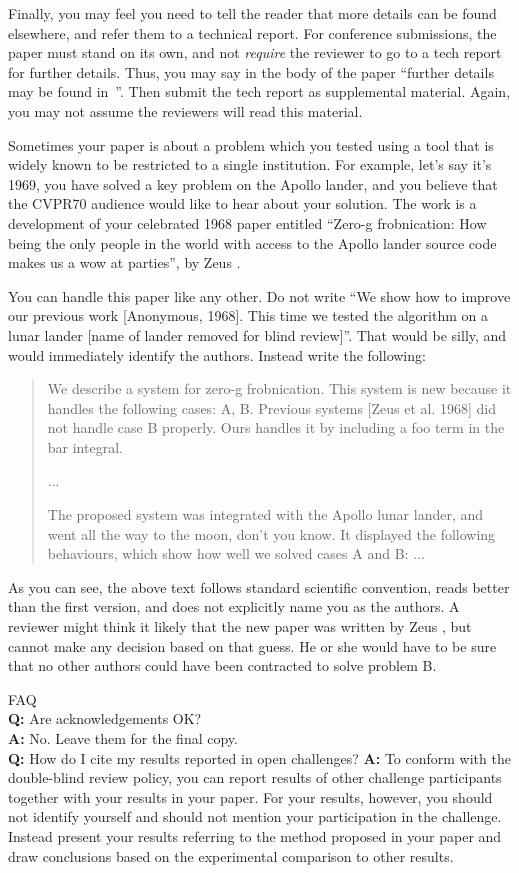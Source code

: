 \documentclass[10pt,twocolumn,letterpaper]{article}
\begin{document}
Finally, you may feel you need to tell the reader that more details can be found elsewhere, and refer them to a technical report.
For conference submissions, the paper must stand on its own, and not {\em require} the reviewer to go to a tech report for further details.
Thus, you may say in the body of the paper ``further details may be found in~\cite{Authors14b}''.
Then submit the tech report as supplemental material.
Again, you may not assume the reviewers will read this material.

Sometimes your paper is about a problem which you tested using a tool that is widely known to be restricted to a single institution.
For example, let's say it's 1969, you have solved a key problem on the Apollo lander, and you believe that the CVPR70 audience would like to hear about your
solution.
The work is a development of your celebrated 1968 paper entitled ``Zero-g frobnication: How being the only people in the world with access to the Apollo lander source code makes us a wow at parties'', by Zeus \etal.

You can handle this paper like any other.
Do not write ``We show how to improve our previous work [Anonymous, 1968].
This time we tested the algorithm on a lunar lander [name of lander removed for blind review]''.
That would be silly, and would immediately identify the authors.
Instead write the following:
\begin{quotation}
\noindent
   We describe a system for zero-g frobnication.
   This system is new because it handles the following cases:
   A, B.  Previous systems [Zeus et al. 1968] did not  handle case B properly.
   Ours handles it by including a foo term in the bar integral.

   ...

   The proposed system was integrated with the Apollo lunar lander, and went all the way to the moon, don't you know.
   It displayed the following behaviours, which show how well we solved cases A and B: ...
\end{quotation}
As you can see, the above text follows standard scientific convention, reads better than the first version, and does not explicitly name you as the authors.
A reviewer might think it likely that the new paper was written by Zeus \etal, but cannot make any decision based on that guess.
He or she would have to be sure that no other authors could have been contracted to solve problem B.
\medskip

\noindent
FAQ\medskip\\
{\bf Q:} Are acknowledgements OK?\\
{\bf A:} No.  Leave them for the final copy.\medskip\\
{\bf Q:} How do I cite my results reported in open challenges?
{\bf A:} To conform with the double-blind review policy, you can report results of other challenge participants together with your results in your paper.
For your results, however, you should not identify yourself and should not mention your participation in the challenge.
Instead present your results referring to the method proposed in your paper and draw conclusions based on the experimental comparison to other results.\medskip\\
\end{document}
